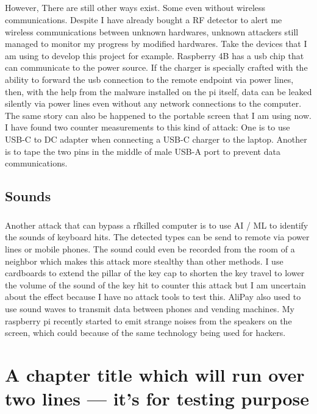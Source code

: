 \documentclass[mscthesis]{usiinfthesis}
\begin{document}
\paragraph{}
However, There are still other ways exist. Some even without wireless communications. Despite I have already bought a RF detector to alert me wireless communications between unknown hardwares, unknown attackers still managed to monitor my progress by modified hardwares. Take the devices that I am using to develop this project for example. Raspberry 4B has a usb chip that can communicate to the power source. If the charger is specially crafted with the ability to forward the usb connection to the remote endpoint via power lines, then, with the help from the malware installed on the pi itself, data can be leaked silently via power lines even without any network connections to the computer. The same story can also be happened to the portable screen that I am using now. I have found two counter measurements to this kind of attack: One is to use USB-C to DC adapter when connecting a USB-C charger to the laptop. Another is to tape the two pins in the middle of male USB-A port to prevent data communications.

\section{Sounds}

\paragraph{}
Another attack that can bypass a rfkilled computer is to use AI / ML to identify the sounds of keyboard hits. The detected types can be send to remote via power lines or mobile phones. The sound could even be recorded from the room of a neighbor which makes this attack more stealthy than other methods. I use cardboards to extend the pillar of the key cap to shorten the key travel to lower the volume of the sound of the key hit to counter this attack but I am uncertain about the effect because I have no attack tools to test this. AliPay also used to use sound waves to transmit data between phones and vending machines. My raspberry pi recently started to emit strange noises from the speakers on the screen, which could because of the same technology being used for hackers.

\chapter[Short title]{A chapter title which will run over two lines --- it's for
  testing purpose}
\end{document}
